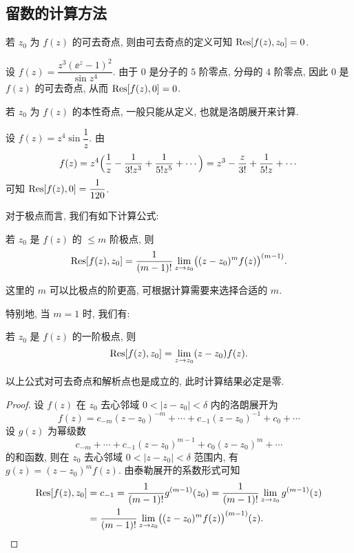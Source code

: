 \subsection{留数的计算方法}

若 $z_0$ 为 $f(z)$ 的可去奇点, 则由可去奇点的定义可知 ${\mathrm{Res}}[f(z),z_0]=0$.

\begin{example}
  设 $f(z)=\dfrac{z^3(\ee^z-1)^2}{\sin z^4}$.
  \smallskip
  由于 $0$ 是分子的 $5$ 阶零点, 分母的 $4$ 阶零点, 因此 $0$ 是 $f(z)$ 的可去奇点, 从而 ${\mathrm{Res}}[f(z),0]=0$.
\end{example}

若 $z_0$ 为 $f(z)$ 的本性奇点, 一般只能从定义, 也就是洛朗展开来计算.

\begin{example}
  设 $f(z)=z^4\sin\dfrac1z$.
  由
  \[
     f(z)
    =z^4\Bigl(\frac1z-\frac1{3!z^3}+\frac1{5!z^5}+\cdots\Bigr)
    =z^3-\frac z{3!}+\frac1{5!z}+\cdots
  \]
  可知 ${\mathrm{Res}}[f(z),0]=\dfrac1{120}$.
\end{example}

对于极点而言, 我们有如下计算公式:

\begin{theorem}[留数计算公式 I]
  \label{thm:residue-formula-for-pole}
  若 $z_0$ 是 $f(z)$ 的 $\le m$ 阶极点, 则
  \[
    {\mathrm{Res}}[f(z),z_0]=\frac1{(m-1)!}\lim_{z\rightarrow z_0}\bigl((z-z_0)^mf(z)\bigr)^{(m-1)}.
  \]
\end{theorem}

这里的 $m$ 可以比极点的阶更高, 可根据计算需要来选择合适的 $m$.

特别地, 当 $m=1$ 时, 我们有:
\begin{theorem}[留数计算公式 II]
  若 $z_0$ 是 $f(z)$ 的一阶极点, 则
  \[
    {\mathrm{Res}}[f(z),z_0]=\lim_{z\rightarrow z_0}(z-z_0)f(z).
  \]
\end{theorem}
以上公式对可去奇点和解析点也是成立的, 此时计算结果必定是零.

\begin{proof}
  设 $f(z)$ 在 $z_0$ 去心邻域 $0<|z-z_0|<\delta$ 内的洛朗展开为
  \[
    f(z)=c_{-m}(z-z_0)^{-m}+\cdots+c_{-1}(z-z_0)^{-1}+c_0+\cdots
  \]
  设 $g(z)$ 为幂级数
  \[
    c_{-m}+\cdots+c_{-1}(z-z_0)^{m-1}+c_0(z-z_0)^m+\cdots
  \]
  的和函数, 则在 $z_0$ 去心邻域 $0<|z-z_0|<\delta$ 范围内, 有 $g(z)=(z-z_0)^mf(z)$.
  由泰勒展开的系数形式可知
  \begin{align*}
     {\mathrm{Res}}[f(z),z_0]&
    =c_{-1}
    =\frac1{(m-1)!}g^{(m-1)}(z_0)
    =\frac1{(m-1)!}\lim_{z\rightarrow z_0}g^{(m-1)}(z)\\&
    =\frac1{(m-1)!}\lim_{z\rightarrow z_0}\bigl((z-z_0)^mf(z)\bigr)^{(m-1)}(z).\qedhere
  \end{align*}
\end{proof}


